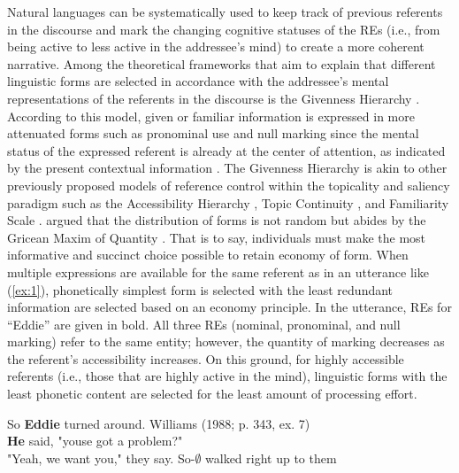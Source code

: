 \documentclass[review]{elsarticle} %
\begin{document}
Natural languages can be systematically used to keep track of previous
referents in the discourse and mark the changing cognitive statuses of
the REs (i.e., from being active to less active in the addressee's mind)
to create a more coherent narrative. Among the theoretical frameworks
that aim to explain that different linguistic forms are selected in
accordance with the addressee's mental representations of the referents
in the discourse is the Givenness Hierarchy \citep{gundel1993}.
According to this model, given or familiar information is expressed in
more attenuated forms such as pronominal use and null marking since the
mental status of the expressed referent is already at the center of
attention, as indicated by the present contextual information
\citep{chafe1976}. The Givenness Hierarchy is akin to other previously
proposed models of reference control within the topicality and saliency
paradigm such as the Accessibility Hierarchy \citep{ariel1990}, Topic
Continuity \citep{givon1983}, and Familiarity Scale \citep{prince1981}.
\citet{gundel1993} argued that the distribution of forms is not random
but abides by the Gricean Maxim of Quantity \citep{grice1975}. That is
to say, individuals must make the most informative and succinct choice
possible to retain economy of form. When multiple expressions are
available for the same referent as in an utterance like (\ref{ex:1}),
phonetically simplest form is selected with the least redundant
information are selected based on an economy principle. In the
utterance, REs for ``Eddie'' are given in bold. All three REs (nominal,
pronominal, and null marking) refer to the same entity; however, the
quantity of marking decreases as the referent's accessibility increases.
On this ground, for highly accessible referents (i.e., those that are
highly active in the mind), linguistic forms with the least phonetic
content are selected for the least amount of processing effort.

\begin{exe}
    \ex \label{ex:1}
    So \textbf{Eddie} turned around. \hfill Williams (1988; p. 343, ex. 7) \\
\textbf{He} said, "youse got a problem?" \\
"Yeah, we want you," they say.
So-$\pmb{\emptyset}$ walked right up to them \\
\end{exe}
\end{document}
